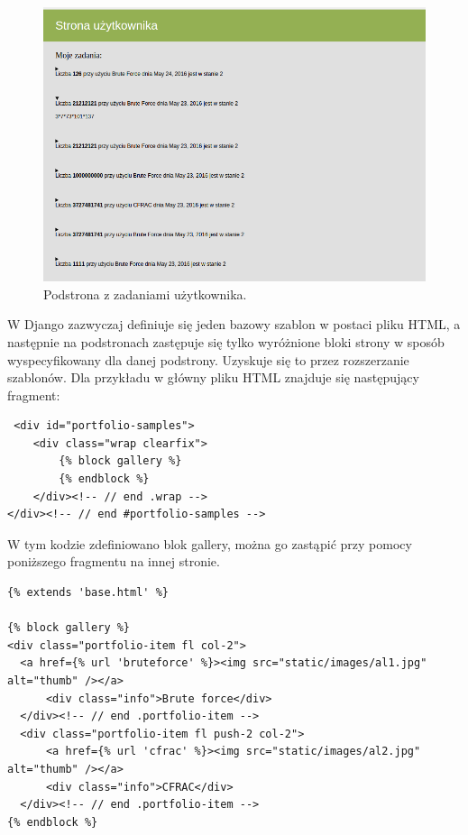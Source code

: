 \documentclass{article}
\begin{document}
\begin{figure}[h!]
    \includegraphics[width=\linewidth]{userpage.png}
    \caption{Podstrona z zadaniami użytkownika.}
    \label{fig:userpagescr}
\end{figure}

W Django zazwyczaj definiuje się jeden bazowy szablon w postaci pliku HTML, a następnie na podstronach zastępuje się tylko wyróżnione bloki strony w sposób wyspecyfikowany dla danej podstrony. Uzyskuje się to przez rozszerzanie szablonów. Dla przykładu w główny pliku HTML znajduje się następujący fragment:

\begin{lstlisting}
 <div id="portfolio-samples">
    <div class="wrap clearfix">
        {% block gallery %}
        {% endblock %}
    </div><!-- // end .wrap -->
</div><!-- // end #portfolio-samples -->
\end{lstlisting}

W tym kodzie zdefiniowano blok gallery, można go zastąpić przy pomocy poniższego fragmentu na innej stronie. 

\begin{lstlisting}
{% extends 'base.html' %}

{% block gallery %}
<div class="portfolio-item fl col-2">
  <a href={% url 'bruteforce' %}><img src="static/images/al1.jpg" alt="thumb" /></a>
      <div class="info">Brute force</div>
  </div><!-- // end .portfolio-item -->
  <div class="portfolio-item fl push-2 col-2">
      <a href={% url 'cfrac' %}><img src="static/images/al2.jpg" alt="thumb" /></a>
      <div class="info">CFRAC</div>
  </div><!-- // end .portfolio-item -->
{% endblock %}
\end{lstlisting}
\end{document}
